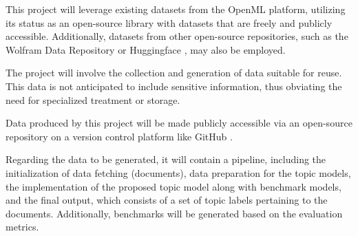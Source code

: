 \documentclass{article}
\begin{document}



This project will leverage existing datasets from the OpenML platform, utilizing its status as an open-source library with datasets that are freely and publicly accessible. Additionally, datasets from other open-source repositories, such as the Wolfram Data Repository \cite{noauthor_wolfram_nodate} or Huggingface \cite{noauthor_hugging_2024}, may also be employed.

The project will involve the collection and generation of data suitable for reuse. This data is not anticipated to include sensitive information, thus obviating the need for specialized treatment or storage.

Data produced by this project will be made publicly accessible via an open-source repository on a version control platform like GitHub \cite{noauthor_github_nodate}.

Regarding the data to be generated, it will contain a pipeline, including the initialization of data fetching (documents), data preparation for the topic models, the implementation of the proposed topic model along with benchmark models, and the final output, which consists of a set of topic labels pertaining to the documents. Additionally, benchmarks will be generated based on the evaluation metrics.
\end{document}
